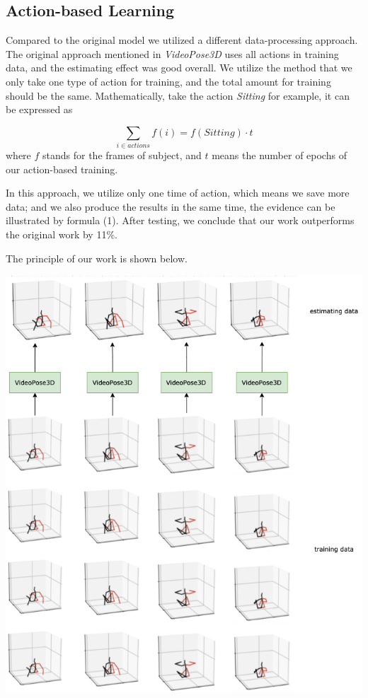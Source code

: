 \documentclass[10pt,twocolumn,letterpaper]{article}
\begin{document}
\subsection{Action-based Learning}

Compared to the original model we utilized a different data-processing approach. The original approach
mentioned in \textit{VideoPose3D} uses all actions in training data, and the estimating effect was good
overall. We utilize the method that we only take one type of action for training, and the total amount 
for training should be the same. Mathematically, take the action \textit{Sitting} for example, it can 
be expressed as

\begin{equation}
	\sum_{i\in actions}{f(i)} = f(Sitting)\cdot t
\end{equation}
where $f$ stands for the frames of subject, and $t$ means the number of epochs of our action-based 
training.

In this approach, we utilize only one time of action, which means we save more data; and we also produce
the results in the same time, the evidence can be illustrated by formula (1). After testing, we conclude 
that our work outperforms the original work by 11\%.

The principle of our work is shown below.

\includegraphics[scale=0.35]{model_new}
\end{document}
